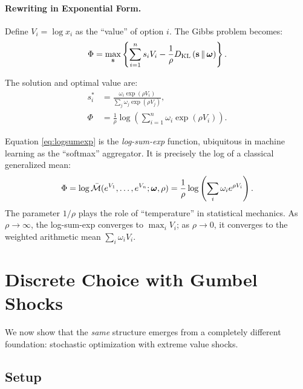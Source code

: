 \paragraph{Rewriting in Exponential Form.}

Define $V_i = \log x_i$ as the ``value'' of option $i$. The Gibbs problem becomes:
\begin{equation}
\label{eq:gibbs-value}
\Phi = \max_{\mathbf{s}} \left\{ \sum_{i=1}^n s_i V_i - \frac{1}{\rho} D_{\mathrm{KL}}\left(\mathbf{s} \,\|\, \boldsymbol{\omega}\right) \right\}.
\end{equation}

The solution and optimal value are:
\begin{align}
s_i^* &= \frac{\omega_i \exp(\rho V_i)}{\sum_j \omega_j \exp(\rho V_j)}, \label{eq:softmax} \\
\Phi &= \frac{1}{\rho} \log \left( \sum_{i=1}^n \omega_i \exp(\rho V_i) \right). \label{eq:logsumexp}
\end{align}

\begin{calloutimportant}
Equation \eqref{eq:logsumexp} is the \emph{log-sum-exp} function, ubiquitous in machine learning as the ``softmax'' aggregator. It is precisely the log of a classical generalized mean:
\begin{equation}
\Phi = \log \bar{\mathcal{M}}(e^{V_1}, \ldots, e^{V_n}; \boldsymbol{\omega}, \rho) = \frac{1}{\rho} \log \left( \sum_i \omega_i e^{\rho V_i} \right).
\end{equation}
The parameter $1/\rho$ plays the role of ``temperature'' in statistical mechanics. As $\rho \to \infty$, the log-sum-exp converges to $\max_i V_i$; as $\rho \to 0$, it converges to the weighted arithmetic mean $\sum_i \omega_i V_i$.
\end{calloutimportant}

\section{Discrete Choice with Gumbel Shocks}
\label{sec:gumbel}

We now show that the \emph{same} structure emerges from a completely different foundation: stochastic optimization with extreme value shocks.

\subsection{Setup}

